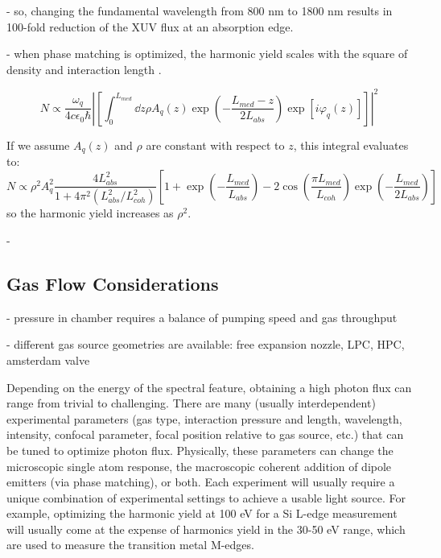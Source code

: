 - so, changing the fundamental wavelength from 800 nm to 1800 nm results in 100-fold reduction of the XUV flux at an absorption edge.

- when phase matching is optimized, the harmonic yield scales with the square of density and interaction length \cite{constantOptimizingHighHarmonic1999}.

\begin{equation}
N \propto \frac{\omega_q}{4 c \epsilon_0 \hbar} \left| \left[ \int_{0}^{L_{med}} \dd{z} \rho A_q(z) \exp \left( -\frac{L_{med} - z}{2L_{abs}} \right) \exp \left[ i \varphi_q(z) \right]\right] \right|^2
\end{equation}

If we assume $A_q(z)$ and $\rho$ are constant with respect to $z$, this integral evaluates to:
\begin{equation}
N \propto \rho^2 A_q^2 \frac{4 L_{abs}^2}{1+4 \pi^2 (L_{abs}^2/L_{coh}^2)} \left[ 1 + \exp \left(-\frac{L_{med}}{L_{abs}}\right) - 2 \cos \left(\frac{\pi L_{med}}{L_{coh}}\right) \exp \left(- \frac{L_{med}}{2 L_{abs}} \right)  \right]
\label{eqn:1D_HHG_yield}
\end{equation}
so the harmonic yield increases as $\rho^2$.

- 



\subsection{Gas Flow Considerations}




- pressure in chamber requires a balance of pumping speed and gas throughput

- different gas source geometries are available: free expansion nozzle, LPC, HPC, amsterdam valve


Depending on the energy of the spectral feature, obtaining a high photon flux can range from trivial to challenging. There are many (usually interdependent) experimental parameters (gas type, interaction pressure and length, wavelength, intensity, confocal parameter, focal position relative to gas source, etc.) that can be tuned to optimize photon flux. Physically, these parameters can change the microscopic single atom response, the macroscopic coherent addition of dipole emitters (via phase matching), or both. Each experiment will usually require a unique combination of experimental settings to achieve a usable light source. For example, optimizing the harmonic yield at 100 eV for a Si L-edge measurement will usually come at the expense of harmonics yield in the 30-50 eV range, which are used to measure the transition metal M-edges.

